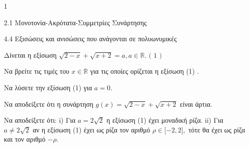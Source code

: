 \begin{ylh}{1}
\item 2.1 Μονοτονία-Ακρότατα-Συμμετρίες Συνάρτησης
\item 4.4 Εξισώσεις και ανισώσεις που ανάγονται σε πολυωνυμικές
\end{ylh}
Δίνεται η εξίσωση $\sqrt{2 - x} + \sqrt{x + 2} = a,a \in {\mathbb{R}}.\text{   ( 1 )}$
\begin{alist}
\item Να βρείτε τις τιμές του $x \in {\mathbb{R}}$ για τις οποίες ορίζεται η εξίσωση (1) .
\item Να λύσετε την εξίσωση (1) για $a = 0.$
\item Να αποδείξετε ότι η συνάρτηση $g(x) = \sqrt{2 - x} + \sqrt{x + 2}$ είναι άρτια.
\item Να αποδείξετε ότι:
i) Για $a = 2\sqrt{2}$ η εξίσωση (1) έχει μοναδική ρίζα.
ii) Για $a \neq 2\sqrt{2}$ αν η εξίσωση (1) έχει ως ρίζα τον αριθμό $\rho \in \lbrack - 2,2\rbrack,$ τότε θα έχει ως ρίζα και τον αριθμό $- \rho.$
\end{alist}

